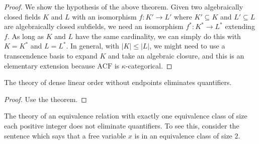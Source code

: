 \documentclass[../notes.tex]{subfiles}
\begin{document}
\begin{proof}
	We show the hypothesis of the above theorem. Given two algebraically closed fields $K$ and $L$ with an isomorphism $f\colon K'\to L'$ where $K'\subseteq K$ and $L'\subseteq L$ are algebraically closed subfields, we need an isomorphism $f^*\colon K^*\to L^*$ extending $f$. As long as $K$ and $L$ have the same cardinality, we can simply do this with $K=K^*$ and $L=L^*$. In general, with $\left|K\right|\le\left|L\right|$, we might need to use a transcendence basis to expand $K$ and take an algebraic closure, and this is an elementary extension because $\mathrm{ACF}$ is $\kappa$-categorical.
\end{proof}
\begin{corollary}
	The theory of dense linear order without endpoints eliminates quantifiers.
\end{corollary}
\begin{proof}
	Use the theorem.
\end{proof}
\begin{nex}
	The theory of an equivalence relation with exactly one equivalence class of size each positive integer does not eliminate quantifiers. To see this, consider the sentence which says that a free variable $x$ is in an equivalence class of size $2$.
\end{nex}
\end{document}
